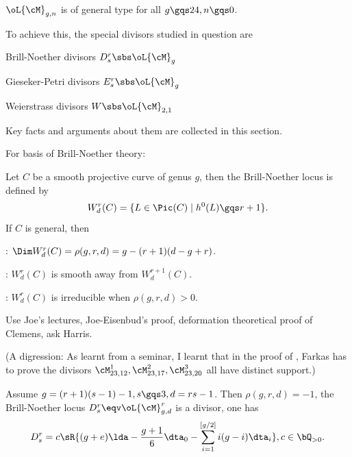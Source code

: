\documentclass[a4paper, twoside]{article}
\begin{document}



\begin{thm}
	$\oL{\cM}_{g,n}$ is of general type for all $g\gqs24,n\gqs0$.
\end{thm}

\begin{rmk}
	To achieve this, the special divisors studied in question are
	\begin{enr}
		\item Brill-Noether divisors $D_{s}^{r}\sbs\oL{\cM}_{g}$
		\item Gieseker-Petri divisors $E_{s}^{r}\sbs\oL{\cM}_{g}$
		\item Weierstrass divisors $W\sbs\oL{\cM}_{2,1}$
	\end{enr}
	Key facts and arguments about them are collected in this section.
\end{rmk}


For basis of Brill-Noether theory:
\begin{thm}
	Let $C$ be a smooth projective curve of genus $g$, then the Brill-Noether locus is defined by
	\[
		W_{d}^{r}(C)=\{L\in\Pic(C)\mid h^{0}(L)\gqs r+1\}.
	\]
	If $C$ is general, then
	\begin{enr}
		\item \cite{GH1980}: $\Dim W_{d}^{r}(C)=\rho(g,r,d)=g-(r+1)(d-g+r)$.
		\item \cite{Gieseker1982}: $W_{d}^{r}(C)$ is smooth away from $W_{d}^{r+1}(C)$.
		\item \cite{FL1981}: $W_{d}^{r}(C)$ is irreducible when $\rho(g,r,d)>0$.
	\end{enr}
\end{thm}



Use Joe's lectures, Joe-Eisenbud's proof, deformation theoretical proof of Clemens\cite{Clemens2000}, ask Harris.

(A digression: As learnt from a seminar, I learnt that in the proof of \cite{FJP2020}, Farkas has to prove the divisors $\cM_{23,12}^{1},\cM_{23,17}^{2},\cM_{23,20}^{3}$ all have distinct support.)



\begin{thm}
	Assume $g=(r+1)(s-1)-1, s\gqs3, d=rs-1$. Then $\rho(g,r,d)=-1$, the Brill-Noether locus $D_{s}^{r}\eqv\oL{\cM}_{g,d}^{r}$ is a divisor, one has
	\[
		D_{s}^{r}=c\sR{(g+e)\lda-\frac{g+1}{6}\dta_{0}-\sum_{i=1}^{[g/2]}i(g-i)\dta_{i}}, c\in\bQ_{>0}.
	\]
\end{thm}
\end{document}
